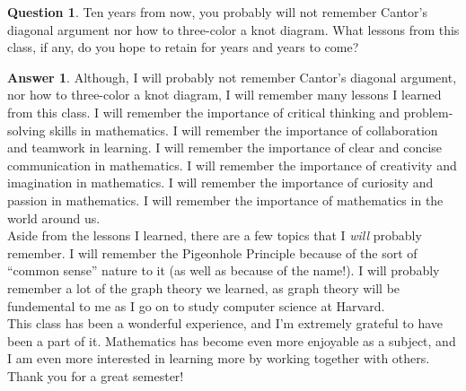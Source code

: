 \documentclass[article, 12pt]{article}
\theoremstyle{definition}
\newtheorem{question}{Question}
\newtheorem{answer}{Answer}
\begin{document}
    \begin{question}
        Ten years from now, you probably will not remember Cantor's diagonal argument nor how to three-color a knot diagram. What lessons from this class, if any, do you hope to retain for years and years to come?   
    \end{question}
    \begin{answer}
        Although, I will probably not remember Cantor's diagonal argument, nor how to three-color a knot diagram, I will remember many lessons I learned from this class. I will remember the importance of critical thinking and problem-solving skills in mathematics. I will remember the importance of collaboration and teamwork in learning. I will remember the importance of clear and concise communication in mathematics. I will remember the importance of creativity and imagination in mathematics. I will remember the importance of curiosity and passion in mathematics. I will remember the importance of mathematics in the world around us.
        \\[12pt]
        Aside from the lessons I learned, there are a few topics that I \textit{will} probably remember. I will remember the Pigeonhole Principle because of the sort of ``common sense'' nature to it (as well as because of the name!). I will probably remember a lot of the graph theory we learned, as graph theory will be fundemental to me as I go on to study computer science at Harvard.
        \\[12pt]
        This class has been a wonderful experience, and I'm extremely grateful to have been a part of it. Mathematics has become even more enjoyable as a subject, and I am even more interested in learning more by working together with others. Thank you for a great semester!
    \end{answer}
\end{document}
